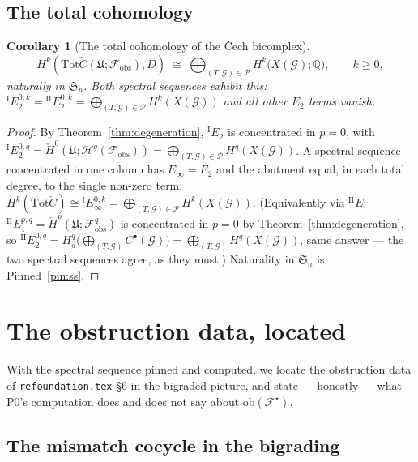\documentclass[11pt,oneside]{amsart}
\theoremstyle{plain}
\newtheorem{corollary}[theorem]{Corollary}
\theoremstyle{definition}
\theoremstyle{remark}
\theoremstyle{honeststyle}
\newcommand{\F}{\mathcal{F}}
\newcommand{\G}{\mathcal{G}}
\newcommand{\Fstar}{\F^{\star}}
\newcommand{\Sym}{\mathfrak{S}}
\newcommand{\Q}{\mathbb{Q}}
\newcommand{\ob}{\mathrm{ob}}
\newcommand{\Tot}{\mathrm{Tot}}
\newcommand{\fobs}{\mathcal{F}_{\mathrm{obs}}}
\newcommand{\Pp}{\mathcal{P}}
\newcommand{\Uf}{\mathfrak{U}}
\newcommand{\Ccheck}{\check{C}}
\begin{document}
\subsection{The total cohomology}
\label{ssec:totalcohom}

\begin{corollary}[The total cohomology of the \v{C}ech bicomplex]
\label{cor:totalcohom}
\[
  H^{k}(\Tot\Ccheck(\Uf;\fobs),D)\;\cong\;
  \bigoplus_{(T,\G)\in\Pp}H^{k}\bigl(X(\G);\Q\bigr),
  \qquad k\ge0,
\]
naturally in $\Sym_{n}$. Both spectral sequences exhibit this:
${}^{\mathrm{I}}E_{2}^{0,k}={}^{\mathrm{II}}E_{2}^{0,k}=
\bigoplus_{(T,\G)\in\Pp}H^{k}(X(\G))$ and all other $E_{2}$ terms
vanish.
\end{corollary}

\begin{proof}
By Theorem~\ref{thm:degeneration}, ${}^{\mathrm{I}}E_{2}$ is
concentrated in $p=0$, with ${}^{\mathrm{I}}E_{2}^{0,q}=\check
H^{0}(\Uf;\mathcal H^{q}(\fobs))=\bigoplus_{(T,\G)\in\Pp}H^{q}(X(\G))$.
A spectral sequence concentrated in one column has $E_{\infty}=E_{2}$
and the abutment equal, in each total degree, to the single non-zero
term: $H^{k}(\Tot\Ccheck)\cong{}^{\mathrm{I}}E_{\infty}^{0,k}=
\bigoplus_{(T,\G)\in\Pp}H^{k}(X(\G))$. (Equivalently via
${}^{\mathrm{II}}E$: ${}^{\mathrm{II}}E_{1}^{p,q}=\check H^{p}(\Uf;
\fobs^{q})$ is concentrated in $p=0$ by Theorem~\ref{thm:degeneration},
so ${}^{\mathrm{II}}E_{2}^{0,q}=H^{q}_{d}\bigl(\bigoplus_{(T,\G)}
C^{\bullet}(\G)\bigr)=\bigoplus_{(T,\G)}H^{q}(X(\G))$, same answer ---
the two spectral sequences agree, as they must.) Naturality in
$\Sym_{n}$ is Pinned~\ref{pin:ss}.
\end{proof}

\section{The obstruction data, located}
\label{sec:obstruction-located}

With the spectral sequence pinned and computed, we locate the
obstruction data of \texttt{refoundation.tex} \S6 in the bigraded
picture, and state --- honestly --- what P0's computation does and
does not say about $\ob(\Fstar)$.

\subsection{The mismatch cocycle in the bigrading}
\label{ssec:mismatch}
\end{document}
